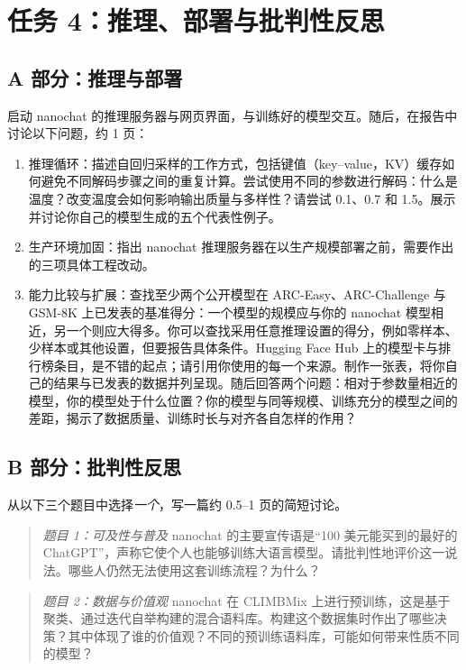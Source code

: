 \section{任务 4：推理、部署与批判性反思}
\label{sec:task4}

\subsection{A 部分：推理与部署}

启动 nanochat 的推理服务器与网页界面，与训练好的模型交互。随后，在报告中讨论以下问题，约 1 页：

\begin{enumerate}
    \item 推理循环：描述自回归采样的工作方式，包括键值（key--value，KV）缓存如何避免不同解码步骤之间的重复计算。尝试使用不同的参数进行解码：什么是温度？改变温度会如何影响输出质量与多样性？请尝试 0.1、0.7 和 1.5。展示并讨论你自己的模型生成的五个代表性例子。
    \item 生产环境加固：指出 nanochat 推理服务器在以生产规模部署之前，需要作出的三项具体工程改动。
    \item 能力比较与扩展：查找至少两个公开模型在 ARC-Easy、ARC-Challenge 与 GSM-8K 上已发表的基准得分：一个模型的规模应与你的 nanochat 模型相近，另一个则应大得多。你可以查找采用任意推理设置的得分，例如零样本、少样本或其他设置，但要报告具体条件。Hugging Face Hub 上的模型卡与排行榜条目，是不错的起点；请引用你使用的每一个来源。制作一张表，将你自己的结果与已发表的数据并列呈现。随后回答两个问题：相对于参数量相近的模型，你的模型处于什么位置？你的模型与同等规模、训练充分的模型之间的差距，揭示了数据质量、训练时长与对齐各自怎样的作用？
\end{enumerate}

\subsection{B 部分：批判性反思}

从以下三个题目中选择{\em 一个}，写一篇约 0.5--1 页的简短讨论。

\begin{quote}
{\em 题目 1：可及性与普及}
nanochat 的主要宣传语是“100 美元能买到的最好的 ChatGPT”，声称它使个人也能够训练大语言模型。请批判性地评价这一说法。哪些人仍然无法使用这套训练流程？为什么？
\end{quote}

\begin{quote}
{\em 题目 2：数据与价值观}
nanochat 在 CLIMBMix 上进行预训练，这是基于聚类、通过迭代自举构建的混合语料库。构建这个数据集时作出了哪些决策？其中体现了谁的价值观？不同的预训练语料库，可能如何带来性质不同的模型？
\end{quote}

